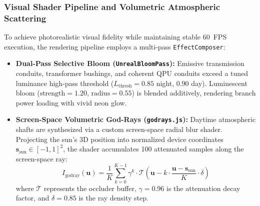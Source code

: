 \documentclass[11pt,a4paper]{article}
\theoremstyle{definition}
\theoremstyle{remark}
\begin{document}
\subsubsection{Visual Shader Pipeline and Volumetric Atmospheric Scattering}
To achieve photorealistic visual fidelity while maintaining stable 60~FPS execution, the rendering pipeline employs a multi-pass \texttt{EffectComposer}:
\begin{itemize}
    \item \textbf{Dual-Pass Selective Bloom (\texttt{UnrealBloomPass}):} Emissive transmission conduits, transformer bushings, and coherent QPU conduits exceed a tuned luminance high-pass threshold ($L_{\text{thresh}} = 0.85$ night, $0.90$ day). Luminescent bloom ($\text{strength} = 1.20$, $\text{radius} = 0.55$) is blended additively, rendering branch power loading with vivid neon glow.
    \item \textbf{Screen-Space Volumetric God-Rays (\texttt{godrays.js}):} Daytime atmospheric shafts are synthesized via a custom screen-space radial blur shader. Projecting the sun's 3D position into normalized device coordinates $\mathbf{s}_{\text{sun}} \in [-1, 1]^2$, the shader accumulates 100 attenuated samples along the screen-space ray:
    \begin{equation}
    I_{\text{godray}}(\mathbf{u}) = \frac{1}{K} \sum_{k=0}^{K-1} \gamma^k \cdot \mathcal{T}\left(\mathbf{u} - k \cdot \frac{\mathbf{u} - \mathbf{s}_{\text{sun}}}{K} \cdot \delta\right)
    \end{equation}
    where $\mathcal{T}$ represents the occluder buffer, $\gamma = 0.96$ is the attenuation decay factor, and $\delta = 0.85$ is the ray density step.
\end{itemize}
\end{document}
